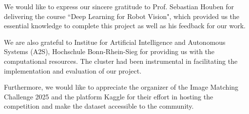 \documentclass[report.tex]{subfiles}
\begin{document}
    \begin{acknowledgements}
        We would like to express our sincere gratitude to Prof. Sebastian Houben for delivering the course ``Deep Learning for Robot Vision", which provided us the essential knowledge to complete this project as well as his feedback for our work.
        
        We are also grateful to Institue for Artificial Intelligence and Autonomous Systems (A2S), Hochschule Bonn-Rhein-Sieg for providing us with the computational resources. The cluster had been instrumental in facilitating the implementation and evaluation of our project.

        Furthermore, we would like to appreciate the organizer of the Image Matching Challenge 2025 and the platform Kaggle for their effort in hosting the competition and make the dataset accessible to the community.
    \end{acknowledgements}
\end{document}
